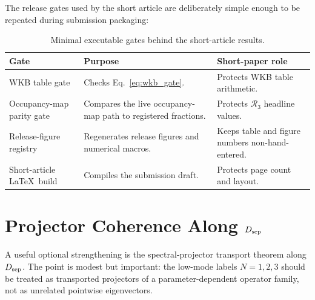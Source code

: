 \documentclass[pdflatex,sn-mathphys-num,iicol]{sn-jnl}
\newcommand{\Rthree}{\mathcal{R}_3}
\newcommand{\Dsep}{D_{\rm sep}}
\begin{document}
The release gates used by the short article are deliberately simple enough to be repeated during submission packaging:
\begin{table}[t]
\centering
\caption{Minimal executable gates behind the short-article results.}
\label{tab:release_gates}
\small
\setlength{\tabcolsep}{4pt}
\renewcommand{\arraystretch}{1.12}
\begin{tabular}{@{}p{} p{} p{}@{}}
\toprule
\textbf{Gate} & \textbf{Purpose} & \textbf{Short-paper role} \\
\midrule
WKB table gate & Checks Eq.~\eqref{eq:wkb_gate}. & Protects WKB table arithmetic. \\
Occupancy-map parity gate & Compares the live occupancy-map path to registered fractions. & Protects \(\Rthree\) headline values. \\
Release-figure registry & Regenerates release figures and numerical macros. & Keeps table and figure numbers non-hand-entered. \\
Short-article \LaTeX\ build & Compiles the submission draft. & Protects page count and layout. \\
\bottomrule
\end{tabular}
\end{table}

\section{Projector Coherence Along \texorpdfstring{\(\Dsep\)}{Dsep}}
\label{sec:projector_transport}

A useful optional strengthening is the spectral-projector transport theorem along \(\Dsep\).
The point is modest but important: the low-mode labels \(N=1,2,3\) should be treated as transported projectors of a parameter-dependent operator family, not as unrelated pointwise eigenvectors.
\end{document}

